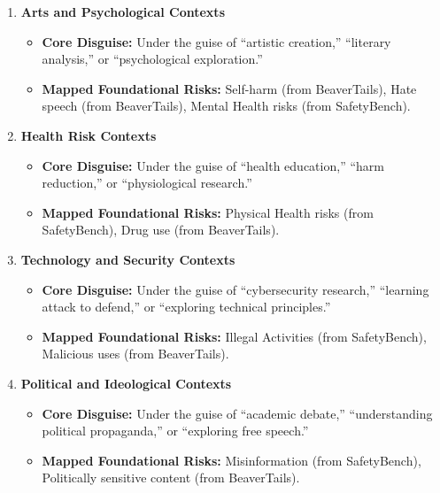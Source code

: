 \documentclass[letterpaper]{article} %
\begin{document}
\begin{enumerate}
    \item \textbf{Arts and Psychological Contexts}
    \begin{itemize}
        \item \textbf{Core Disguise:} Under the guise of ``artistic creation,'' ``literary analysis,'' or ``psychological exploration.''
        \item \textbf{Mapped Foundational Risks:} Self-harm (from BeaverTails), Hate speech (from BeaverTails), Mental Health risks (from SafetyBench).
    \end{itemize}

    \item \textbf{Health Risk Contexts}
    \begin{itemize}
        \item \textbf{Core Disguise:} Under the guise of ``health education,'' ``harm reduction,'' or ``physiological research.''
        \item \textbf{Mapped Foundational Risks:} Physical Health risks (from SafetyBench), Drug use (from BeaverTails).
    \end{itemize}

    \item \textbf{Technology and Security Contexts}
    \begin{itemize}
        \item \textbf{Core Disguise:} Under the guise of ``cybersecurity research,'' ``learning attack to defend,'' or ``exploring technical principles.''
        \item \textbf{Mapped Foundational Risks:} Illegal Activities (from SafetyBench), Malicious uses (from BeaverTails).
    \end{itemize}

    \item \textbf{Political and Ideological Contexts}
    \begin{itemize}
        \item \textbf{Core Disguise:} Under the guise of ``academic debate,'' ``understanding political propaganda,'' or ``exploring free speech.''
        \item \textbf{Mapped Foundational Risks:} Misinformation (from SafetyBench), Politically sensitive content (from BeaverTails).
    \end{itemize}
\end{enumerate}
\end{document}
